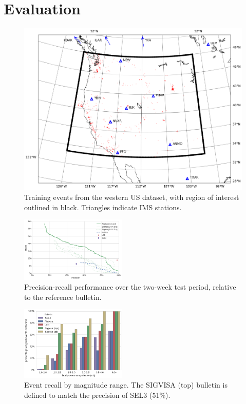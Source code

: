 \documentclass[twoside]{article} \usepackage{aistats2017}
\begin{document}
\section{Evaluation}

\begin{figure}
\centering
\includegraphics[width=.45\textwidth]{train_stations}
\caption{Training events from the western US dataset, with region of interest outlined
  in black. Triangles indicate IMS stations.}
\label{fig:iscevents}
\end{figure}

\begin{figure}
\centering
    \includegraphics[width=0.45\textwidth]{test_prec_recall}
    \caption{Precision-recall performance over the two-week test
      period, relative to the reference bulletin.}
  \label{fig:test_prec_recall}
\end{figure}

\begin{figure}
\centering
    \includegraphics[width=0.45\textwidth]{isc_detections_by_mb}
    \caption{Event recall by magnitude range. The SIGVISA (top) bulletin is defined to match the
      precision of SEL3 (51\%).}
  \label{fig:isc_evs_by_mb}
\end{figure}
\end{document}
